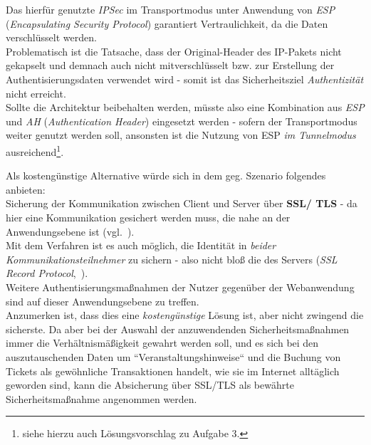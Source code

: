\noindent
Das hierfür genutzte \textit{IPSec} im Transportmodus unter Anwendung von \textit{ESP} (\textit{Encapsulating Security Protocol}) garantiert Vertraulichkeit, da die Daten verschlüsselt werden.\\
Problematisch ist die Tatsache, dass der Original-Header des IP-Pakets nicht gekapselt und demnach auch nicht mitverschlüsselt bzw. zur Erstellung der Authentisierungsdaten verwendet wird - somit ist das Sicherheitsziel \textit{Authentizität} nicht erreicht.\\
Sollte die Architektur beibehalten werden, müsste also eine Kombination aus \textit{ESP} und \textit{AH} (\textit{Authentication Header}) eingesetzt werden - sofern der Transportmodus weiter genutzt werden soll, ansonsten ist die Nutzung von ESP \textit{im Tunnelmodus} ausreichend\footnote{
    siehe hierzu auch Lösungsvorschlag zu Aufgabe 3.
}.

\noindent
Als kostengünstige Alternative würde sich in dem geg. Szenario folgendes anbieten:\\

\noindent
Sicherung der Kommunikation zwischen Client und Server über \textbf{SSL/ TLS} -
da hier eine Kommunikation gesichert werden muss, die nahe an der Anwendungsebene ist (vgl.~\cite[52]{ITS4}).\\
Mit dem Verfahren ist es auch möglich, die Identität in \textit{beider Kommunikationsteilnehmer} zu sichern - also nicht bloß die des Servers (\textit{SSL Record Protocol},~\cite{RFC6101}).\\
Weitere Authentisierungsmaßnahmen der Nutzer gegenüber der Webanwendung sind auf dieser Anwendungsebene zu treffen.\\
Anzumerken ist, dass dies eine \textit{kostengünstige} Lösung ist, aber nicht zwingend die sicherste.
Da aber bei der Auswahl der anzuwendenden Sicherheitsmaßnahmen immer die Verhältnismäßigkeit gewahrt werden soll, und es sich bei den auszutauschenden Daten um ``Veranstaltungshinweise`` und die Buchung von Tickets als gewöhnliche Transaktionen handelt, wie sie im Internet alltäglich geworden sind, kann die Absicherung über SSL/TLS als bewährte Sicherheitsmaßnahme angenommen werden.



